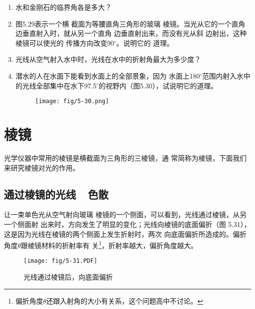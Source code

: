 \begin{enumerate}
    \item 水和金刚石的临界角各是多大？
    \item 图5.29表示一个横
截面为等腰直角三角形的玻璃
棱镜。当光从它的一个直角边垂直射入时，就从另一个直角
边垂直射出来，而没有光从斜
边射出，这种棱镜可以使光的
传播方向改变90$^\circ$。说明它的
道理。
\begin{figure}[htp]
	\centering
{}
	\caption{}
\end{figure}

\item 光线从空气射入水中时，光线在水中的折射角最大为多少度？
\item 潜水的人在水面下能看到水面上的全部景象，因为
水面上180$^\circ$范围内射入水中的光线全部集中在水下97.5$^\circ$的视野内（图5.30），试说明它的道理。
\begin{figure}[htp]\centering
    \texttt{[image: fig/5-30.png]}
    \caption{}
    \end{figure}
\end{enumerate}

\section{棱镜}

光学仪器中常用的棱镜是横截面为三角形的三棱镜，通
常简称为棱镜，下面我们来研究棱镜对光的作用。

\subsection{通过棱镜的光线~~色散}

让一束单色光从空气射向玻璃
棱镜的一个侧面，可以看到，光线通过棱镜，从另一个侧面射
出来时，方向发生了明显的变化；光线向棱镜的底面偏折（图
5.31），这是因为光线在棱镜的两个侧面上发生折射时，两次
向底面偏折所造成的。偏折角度$\theta$跟棱镜材料的折射率有
关\footnote{偏折角度$\theta$还跟入射角的大小有关系，这个问题高中不讨论。}，折射率越大，偏折角度越大。
\begin{figure}[htp]\centering
    \texttt{[image: fig/5-31.PDF]}
    \caption{光线通过棱镜后，向底面偏折}
    \end{figure}

